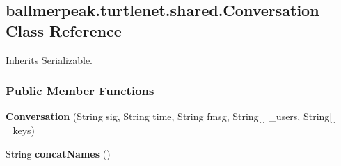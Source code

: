 \hypertarget{classballmerpeak_1_1turtlenet_1_1shared_1_1Conversation}{\subsection{ballmerpeak.\-turtlenet.\-shared.\-Conversation Class Reference}
\label{classballmerpeak_1_1turtlenet_1_1shared_1_1Conversation}
}


Inherits Serializable.

\subsubsection*{Public Member Functions}
\begin{DoxyCompactItemize}
\item 
\hypertarget{classballmerpeak_1_1turtlenet_1_1shared_1_1Conversation_aa3742f0590d5fd167e4d20a9c2c633c1}{{\bfseries Conversation} (String sig, String time, String fmsg, String\mbox{[}$\,$\mbox{]} \-\_\-users, String\mbox{[}$\,$\mbox{]} \-\_\-keys)}\label{classballmerpeak_1_1turtlenet_1_1shared_1_1Conversation_aa3742f0590d5fd167e4d20a9c2c633c1}

\item 
\hypertarget{classballmerpeak_1_1turtlenet_1_1shared_1_1Conversation_aff19390d872b7cc4fe5de755cf2a821e}{String {\bfseries concat\-Names} ()}\label{classballmerpeak_1_1turtlenet_1_1shared_1_1Conversation_aff19390d872b7cc4fe5de755cf2a821e}

\end{DoxyCompactItemize}
